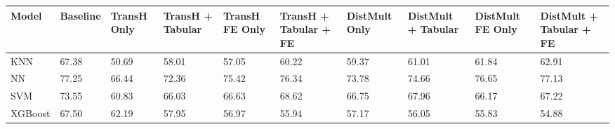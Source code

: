 \begin{tabular}{llllllllll}
\toprule
Model & Baseline & TransH Only & TransH + Tabular & TransH FE Only & TransH + Tabular + FE & DistMult Only & DistMult + Tabular & DistMult FE Only & DistMult + Tabular + FE \\
\midrule
KNN & 67.38 & 50.69 & 58.01 & 57.05 & 60.22 & 59.37 & 61.01 & 61.84 & 62.91 \\
NN & 77.25 & 66.44 & 72.36 & 75.42 & 76.34 & 73.78 & 74.66 & 76.65 & 77.13 \\
SVM & 73.55 & 60.83 & 66.03 & 66.63 & 68.62 & 66.75 & 67.96 & 66.17 & 67.22 \\
XGBoost & 67.50 & 62.19 & 57.95 & 56.97 & 55.94 & 57.17 & 56.05 & 55.83 & 54.88 \\
\bottomrule
\end{tabular}
